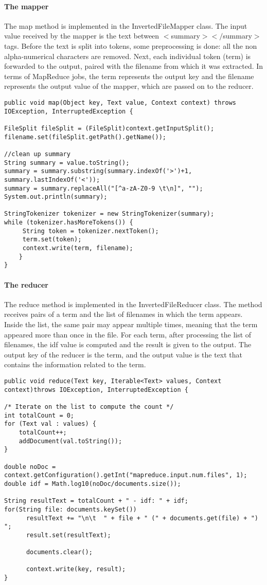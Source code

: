 \documentclass[a4paper,10pt]{article}
\begin{document}
\paragraph{The mapper}
The map method is implemented in the InvertedFileMapper class. The input value received by the mapper is the text between $<$summary$></$summary$>$ tags. Before the text is split into tokens, some preprocessing is done: all the non alpha-numerical characters are removed. Next, each individual token (term) is forwarded to the output, paired with the filename from which it was extracted. In terms of MapReduce jobs, the term represents the output key and the filename represents the output value of the mapper, which are passed on to the reducer.


\begin{lstlisting}
public void map(Object key, Text value, Context context) throws IOException, InterruptedException {

FileSplit fileSplit = (FileSplit)context.getInputSplit(); 
filename.set(fileSplit.getPath().getName());

//clean up summary
String summary = value.toString();
summary = summary.substring(summary.indexOf('>')+1, summary.lastIndexOf('<'));
summary = summary.replaceAll("[^a-zA-Z0-9 \t\n]", "");
System.out.println(summary);

StringTokenizer tokenizer = new StringTokenizer(summary);
while (tokenizer.hasMoreTokens()) {
	 String token = tokenizer.nextToken();
     term.set(token);
 	 context.write(term, filename);
	}
}
\end{lstlisting}

\paragraph{The reducer}
The reduce method is implemented in the InvertedFileReducer class. The method receives pairs of a term and the list of filenames in which the term appears. Inside the list, the same pair may appear multiple times, meaning that the term appeared more than once in the file. For each term, after processing the list of filenames, the idf value is computed and the result is given to the output. The output key of the reducer is the term, and the output value is the text that contains the information related to the term.

\begin{lstlisting}
public void reduce(Text key, Iterable<Text> values, Context context)throws IOException, InterruptedException {
	  
/* Iterate on the list to compute the count */
int totalCount = 0;
for (Text val : values) {
	totalCount++;
	addDocument(val.toString());
}
	
double noDoc = context.getConfiguration().getInt("mapreduce.input.num.files", 1);
double idf = Math.log10(noDoc/documents.size()); 
	
String resultText = totalCount + " - idf: " + idf;
for(String file: documents.keySet())
	  resultText += "\n\t  " + file + " (" + documents.get(file) + ") ";
	  result.set(resultText);
	  
	  documents.clear();
	  
	  context.write(key, result);
}
\end{lstlisting}
\end{document}
